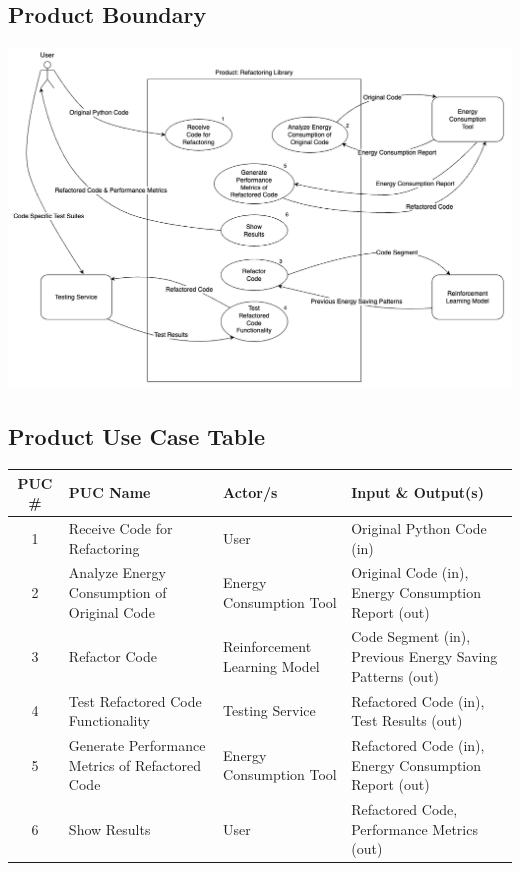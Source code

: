 \documentclass[12pt]{article}
\begin{document}
\subsection{Product Boundary}
\includegraphics[scale=0.4]{../Images/UseCaseDiagram.png}
\subsection{Product Use Case Table}

\setlength\extrarowheight{2mm}
\begin{tabularx}{\textwidth}{|c|
  >{\raggedright\arraybackslash}X|p{1.2in}|
  >{\raggedright\arraybackslash}X|}
  \toprule \textbf{PUC \#} & \textbf{PUC Name} & \textbf{Actor/s} & \textbf{Input \& Output(s)} \\
  \midrule
  1 & Receive Code for Refactoring & User & Original Python Code (in) \\ 
  2 & Analyze Energy Consumption of Original Code & Energy Consumption Tool & Original Code (in), Energy Consumption Report (out) \\ 
  3 & Refactor Code & Reinforcement Learning Model & Code Segment (in), Previous Energy Saving Patterns (out) \\ 
  4 & Test Refactored Code Functionality & Testing Service & Refactored Code (in), Test Results (out) \\ 
  5 & Generate Performance Metrics of Refactored Code & Energy Consumption Tool & Refactored Code (in), Energy Consumption Report (out) \\ 
  6 & Show Results & User & Refactored Code, Performance Metrics (out) \\
  \bottomrule
\end{tabularx}
\end{document}

